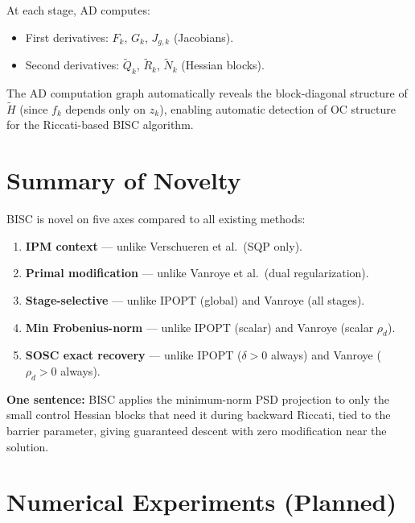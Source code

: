 \documentclass[11pt]{article}
\begin{document}
At each stage, AD computes:
\begin{itemize}
  \item First derivatives: $F_k$, $G_k$, $J_{g,k}$ (Jacobians).
  \item Second derivatives: $\tilde{Q}_k$, $\tilde{R}_k$, $\tilde{N}_k$ (Hessian blocks).
\end{itemize}
The AD computation graph automatically reveals the block-diagonal structure
of $\tilde{H}$ (since $f_k$ depends only on $z_k$), enabling automatic
detection of OC structure for the Riccati-based BISC algorithm.


\section{Summary of Novelty}

BISC is novel on five axes compared to all existing methods:
\begin{enumerate}
  \item \textbf{IPM context} --- unlike Verschueren et al.\ (SQP only).
  \item \textbf{Primal modification} --- unlike Vanroye et al.\ (dual regularization).
  \item \textbf{Stage-selective} --- unlike IPOPT (global) and Vanroye (all stages).
  \item \textbf{Min Frobenius-norm} --- unlike IPOPT (scalar) and Vanroye (scalar $\rho_d$).
  \item \textbf{SOSC exact recovery} --- unlike IPOPT ($\delta > 0$ always)
        and Vanroye ($\rho_d > 0$ always).
\end{enumerate}

\textbf{One sentence:} BISC applies the minimum-norm PSD projection to only the
small control Hessian blocks that need it during backward Riccati, tied to the
barrier parameter, giving guaranteed descent with zero modification near the solution.


\section{Numerical Experiments (Planned)}
\end{document}

